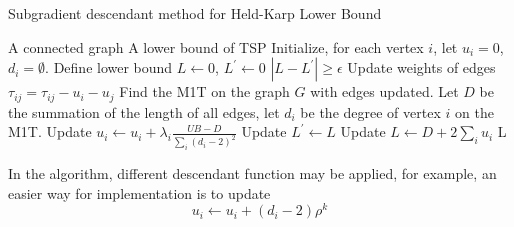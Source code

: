             \begin{algorithm}
                \caption{Subgradient descendant method for Held-Karp Lower Bound}
                \begin{algorithmic}
                    \Require A connected graph
                    \Ensure A lower bound of TSP
                    \State Initialize, for each vertex $i$, let $u_i = 0$, $d_i = \emptyset$. Define lower bound $L \gets 0$, $L^\prime \gets 0$
                    \While $|L - L^\prime| \ge \epsilon$
                        \State Update weights of edges $\tau_{ij} = \tau_{ij} - u_i - u_j$
                        \State Find the M1T on the graph $G$ with edges updated. Let $D$ be the summation of the length of all edges, let $d_i$ be the degree of vertex $i$ on the M1T.
                        \State Update $u_i \gets u_i + \lambda_i \frac{UB - D}{\sum_i (d_i - 2)^2}$
                        \State Update $L^\prime \gets L$
                        \State Update $L \gets D + 2 \sum_i u_i$
                    \EndWhile
                    \State \Return L
                \end{algorithmic}
            \end{algorithm}

            In the algorithm, different descendant function may be applied, for example, an easier way for implementation is to update
            \begin{equation*}
                u_i \gets u_i + (d_i - 2) \rho^k
            \end{equation*}

